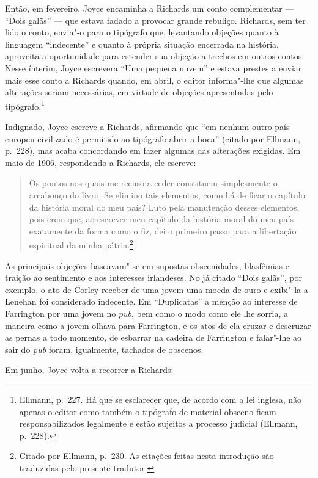 Então, em fevereiro, Joyce encaminha a Richards um conto complementar --- “Dois
galãs” --- que estava fadado a provocar grande rebuliço. Richards, sem ter lido o
conto, envia"-o para o tipógrafo que, levantando objeções quanto à linguagem
“indecente” e quanto à própria situação encerrada na história, aproveita a
oportunidade para estender sua objeção a trechos em outros contos. Nesse
ínterim, Joyce escrevera “Uma pequena nuvem” e estava prestes a enviar mais
esse conto a Richards quando, em abril, o editor informa"-lhe que algumas
alterações seriam necessárias, em virtude de objeções apresentadas pelo
tipógrafo.\footnote{  Ellmann, p.~227. Há que se esclarecer que, de acordo com a
lei inglesa, não apenas o editor como também o tipógrafo de material obsceno
ficam responsabilizados legalmente e estão sujeitos a processo judicial
(Ellmann, p.~228).}

Indignado, Joyce escreve a Richards, afirmando que “em nenhum outro país europeu
civilizado é permitido ao tipógrafo abrir a boca” (citado por Ellmann, p.~228),
mas acaba concordando em fazer algumas das alterações exigidas. Em maio de
1906, respondendo a Richards, ele escreve: 

\begin{quote}
Os pontos nos quais me recuso a ceder constituem simplesmente o arcabouço do
livro. Se elimino tais elementos, como há de ficar o capítulo da história moral
do meu país? Luto pela manutenção desses elementos, pois creio que, ao escrever
meu capítulo da história moral do meu país exatamente da forma como o fiz, dei
o primeiro passo para a libertação espiritual da minha pátria.\footnote{  Citado por
Ellmann, p.~230. As citações feitas nesta introdução são traduzidas
pelo presente tradutor.}
\end{quote}

As principais objeções baseavam"-se em supostas obscenidades, blasfêmias e
traição ao sentimento e aos interesses irlandeses.  No já citado “Dois galãs”,
por exemplo, o ato de Corley receber de uma jovem uma moeda de ouro e exibi"-la
a Lenehan foi considerado indecente. Em “Duplicatas” a menção ao interesse de
Farrington por uma jovem no \textit{pub}, bem como o modo como ele lhe sorria,
a maneira como a jovem olhava para Farrington, e os atos de ela cruzar e
descruzar as pernas a todo momento, de esbarrar na cadeira de Farrington e
falar"-lhe ao sair do \textit{pub} foram, igualmente, tachados de obscenos.

Em junho, Joyce volta a recorrer a Richards: 

